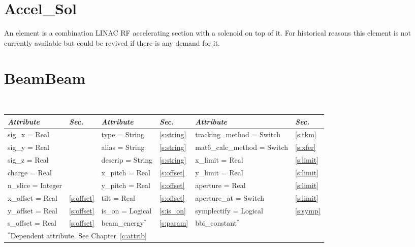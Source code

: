\section{Accel\_Sol}
\label{s:accel_sol}

An  element is a combination LINAC RF accelerating
section with a solenoid on top of it. For historical reasons this
element is not currently available but could be revived if there is
any demand for it.

\section{BeamBeam}
\label{s:bbi}

\begin{center} 
\tt
\begin{tabular}{|l|l||l|l||l|l|} \hline
  {\sl Attribute} & {\sl Sec.}  & {\sl Attribute} & {\sl Sec.} & {\sl Attribute} & {\sl Sec.} \\ \hline
  sig\_x   = Real       &                 & type = String    & \ref{s:string} & tracking\_method = Switch    & \ref{s:tkm}    \\ \hline
  sig\_y   = Real       &                 & alias = String   & \ref{s:string} & mat6\_calc\_method = Switch  & \ref{s:xfer}   \\ \hline
  sig\_z   = Real       &                 & descrip = String & \ref{s:string} & x\_limit    = Real           & \ref{s:limit}  \\ \hline
  charge   = Real       &                 & x\_pitch = Real  & \ref{s:offset} & y\_limit    = Real           & \ref{s:limit}  \\ \hline
  n\_slice = Integer    &                 & y\_pitch = Real  & \ref{s:offset} & aperture    = Real           & \ref{s:limit}  \\ \hline
  x\_offset = Real      & \ref{s:offset}  & tilt = Real      & \ref{s:offset} & aperture\_at = Switch        & \ref{s:limit}  \\ \hline
  y\_offset = Real      & \ref{s:offset}  & is\_on = Logical & \ref{s:is_on}  & symplectify = Logical        & \ref{s:symp}   \\ \hline
  s\_offset = Real      & \ref{s:offset}  & beam\_energy$^*$ & \ref{s:param}  & bbi\_constant$^*$            &                \\ \hline
  \multicolumn{6}{l}{\small $^*$Dependent attribute. See Chapter~\ref{c:attrib}} \\
\end{tabular}
\end{center}
\toffset

